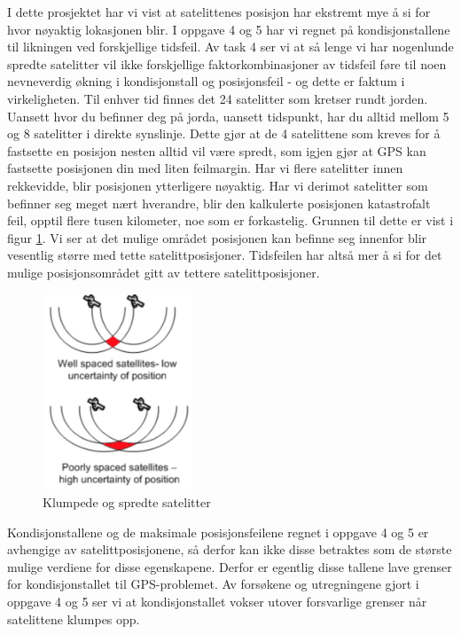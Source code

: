I dette prosjektet har vi vist at satelittenes posisjon har ekstremt mye å si for hvor nøyaktig lokasjonen blir. I oppgave 4 og 5 har vi regnet på kondisjonstallene til likningen ved forskjellige tidsfeil. Av task 4 ser vi at så lenge vi har nogenlunde spredte satelitter vil ikke forskjellige faktorkombinasjoner av tidsfeil føre til noen nevneverdig økning i kondisjonstall og posisjonsfeil - og dette er faktum i virkeligheten. Til enhver tid finnes det 24 satelitter som kretser rundt jorden. Uansett hvor du befinner deg på jorda, uansett tidspunkt, har du alltid mellom 5 og 8 satelitter i direkte synslinje. Dette gjør at de 4 satelittene som kreves for å fastsette en posisjon nesten alltid vil være spredt, som igjen gjør at GPS kan fastsette posisjonen din med liten feilmargin. Har vi flere satelitter innen rekkevidde, blir posisjonen ytterligere nøyaktig. Har vi derimot satelitter som befinner seg meget nært hverandre, blir den kalkulerte posisjonen katastrofalt feil, opptil flere tusen kilometer, noe som er forkastelig. Grunnen til dette er vist i figur \ref{fig:bunchedsat}. Vi ser at det mulige området posisjonen kan befinne seg innenfor blir vesentlig større med tette satelittposisjoner. Tidsfeilen har altså mer å si for det mulige posisjonsområdet gitt av tettere satelittposisjoner.

\begin{figure}[htbp]
	\centering
	\includegraphics[width=0.4\textwidth]{sections/Conclusion/bunchedsat.png}
	\caption{Klumpede og spredte satelitter}
	\label{fig:bunchedsat}
\end{figure}

Kondisjonstallene og de maksimale posisjonsfeilene regnet i oppgave 4 og 5 er avhengige av satelittposisjonene, så derfor kan ikke disse betraktes som de største mulige verdiene for disse egenskapene. Derfor er egentlig disse tallene lave grenser for kondisjonstallet til GPS-problemet. Av forsøkene og utregningene gjort i oppgave 4 og 5 ser vi at kondisjonstallet vokser utover forsvarlige grenser når satelittene klumpes opp. 

